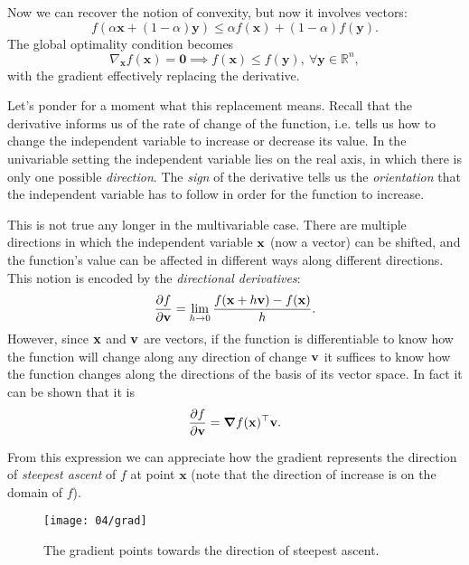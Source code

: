 Now we can recover the notion of convexity, but now it involves vectors:
\begin{equation}
	f(\alpha \mathbf{x} + (1 - \alpha)\mathbf{y}) \leq \alpha f(\mathbf{x}) + (1 - \alpha) f(\mathbf{y}).
\end{equation}
The global optimality condition becomes
\begin{equation}
	\nabla_{\mathbf{x}}f(\mathbf{x}) = \mathbf{0} \implies f(\mathbf{x}) \leq f(\mathbf{y}), \ \forall \mathbf{y} \in \mathbb{R}^n,
\end{equation}
with the gradient effectively replacing the derivative.

Let's ponder for a moment what this replacement means. Recall that the derivative informs us of the rate of change of the function, i.e. tells us how to change the independent variable to increase or decrease its value. In the univariable setting the independent variable lies on the real axis, in which there is only one possible \emph{direction}. The \emph{sign} of the derivative tells us the \emph{orientation} that the independent variable has to follow in order for the function to increase.

This is not true any longer in the multivariable case. There are multiple directions in which the independent variable $\vb{x}$ (now a vector) can be shifted, and the function's value can be affected in different ways along different directions. This notion is encoded by the \emph{directional derivatives}:
\begin{equation}
    \pdv{f}{\vb{v}}(\vb{x}) = \lim_{h \to 0} \frac{f(\vb{x} + h \vb{v}) - f(\vb{x})}{h}.
\end{equation}
However, since $\vb{x}$ and $\vb{v}$ are vectors, if the function is differentiable to know how the function will change along any direction of change $\vb{v}$ it suffices to know how the function changes along the directions of the basis of its vector space. In fact it can be shown that it is
\begin{equation}
    \pdv{f}{\vb{v}}(\vb{x}) = \grad f (\vb{x})^{\top} \vb{v}.
\end{equation}

From this expression we can appreciate how the gradient represents the direction of \emph{steepest ascent} of $f$ at point $\mathbf{x}$ (note that the direction of increase is on the domain of $f$). 

\begin{figure}[H]
	\centering
	\texttt{[image: 04/grad]}
	\caption{The gradient points towards the direction of steepest ascent.}\label{fig:gradient}	
\end{figure}

